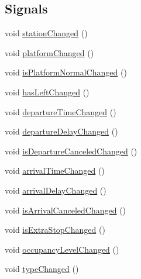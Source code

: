 \subsection*{Signals}
\begin{DoxyCompactItemize}
\item 
void \mbox{\hyperlink{classQRail_1_1VehicleEngine_1_1Stop_a1258c85863b7b97abaf17cfb8e501291}{station\+Changed}} ()
\item 
void \mbox{\hyperlink{classQRail_1_1VehicleEngine_1_1Stop_ac86de140f12def7670c8b93ea1cb7fc8}{platform\+Changed}} ()
\item 
void \mbox{\hyperlink{classQRail_1_1VehicleEngine_1_1Stop_aa70577966878f55565b8b4f8f09e0622}{is\+Platform\+Normal\+Changed}} ()
\item 
void \mbox{\hyperlink{classQRail_1_1VehicleEngine_1_1Stop_a359a480758ad5a3a4ab5370cd1e2309b}{has\+Left\+Changed}} ()
\item 
void \mbox{\hyperlink{classQRail_1_1VehicleEngine_1_1Stop_aaa9b2c588be0e401fdaaaa064ceb54fb}{departure\+Time\+Changed}} ()
\item 
void \mbox{\hyperlink{classQRail_1_1VehicleEngine_1_1Stop_a407f8c397421dfae0375ebe3a859f5f0}{departure\+Delay\+Changed}} ()
\item 
void \mbox{\hyperlink{classQRail_1_1VehicleEngine_1_1Stop_acd4661344cc6b1059aa92a619286ae8a}{is\+Departure\+Canceled\+Changed}} ()
\item 
void \mbox{\hyperlink{classQRail_1_1VehicleEngine_1_1Stop_a786a1947c63eac489569f7bf24196d96}{arrival\+Time\+Changed}} ()
\item 
void \mbox{\hyperlink{classQRail_1_1VehicleEngine_1_1Stop_a0f5bddbd48b71e1b00272c7b6684e89f}{arrival\+Delay\+Changed}} ()
\item 
void \mbox{\hyperlink{classQRail_1_1VehicleEngine_1_1Stop_a7bab4fe67bbb63a15d14d3cfca38dfe4}{is\+Arrival\+Canceled\+Changed}} ()
\item 
void \mbox{\hyperlink{classQRail_1_1VehicleEngine_1_1Stop_a719fb40f24b3c7353887c7b9c2af2300}{is\+Extra\+Stop\+Changed}} ()
\item 
void \mbox{\hyperlink{classQRail_1_1VehicleEngine_1_1Stop_a77370a1e3f2383882ab2112fa9f23510}{occupancy\+Level\+Changed}} ()
\item 
void \mbox{\hyperlink{classQRail_1_1VehicleEngine_1_1Stop_a4930b684f8b240cac0157edc5e2d0a08}{type\+Changed}} ()
\end{DoxyCompactItemize}
